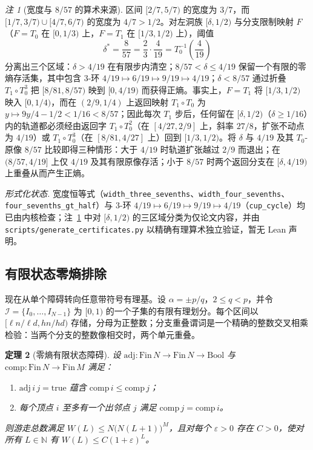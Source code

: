 \documentclass[11pt,a4paper]{article}
\newtheorem{theorem}{定理}[section]
\theoremstyle{remark}
\newtheorem{remark}[theorem]{注}
\newcommand{\N}{\mathbb{N}}
\begin{document}
\begin{remark}[宽度与 $8/57$ 的算术来源]
\label{rem:857}
区间 $[2/7,5/7)$ 的宽度为 $3/7$，而 $[1/7,3/7) \cup [4/7,6/7)$ 的宽度为 $4/7 > 1/2$。对左洞族 $[\delta,1/2)$ 与分支限制映射 $F$（$F = T_{0}$ 在 $[0,1/3)$ 上，$F = T_{1}$ 在 $[1/3,1/2)$ 上），阈值
\[
  \delta^{*} = \frac{8}{57} = \frac23 \cdot \frac{4}{19} = T_{0}^{-1}\!\left(\frac{4}{19}\right)
\]
分离出三个区域：$\delta > 4/19$ 在有限步内清空；$8/57 < \delta \le 4/19$ 保留一个有限的零熵存活集，其中包含 $3$-环 $4/19 \mapsto 6/19 \mapsto 9/19 \mapsto 4/19$；$\delta < 8/57$ 通过折叠 $T_{1} \circ T_{0}^{3}$ 把 $[8/81,8/57)$ 映到 $[0,4/19)$ 而获得正熵。事实上，$F = T_{1}$ 将 $[1/3,1/2)$ 映入 $[0,1/4)$，而在 $(2/9,1/4)$ 上返回映射 $T_{1} \circ T_{0}$ 为 $y \mapsto 9y/4 - 1/2 < 1/16 < 8/57$；因此每次 $T_{1}$ 步后，任何留在 $[\delta,1/2)$（$\delta \ge 1/16$）内的轨道都必须经由返回字 $T_{1} \circ T_{0}^{2}$（在 $[4/27,2/9]$ 上，斜率 $27/8$，扩张不动点为 $4/19$）或 $T_{1} \circ T_{0}^{3}$（在 $[8/81,4/27]$ 上）回到 $[1/3,1/2)$。将 $\delta$ 与 $4/19$ 及其 $T_{0}$-原像 $8/57$ 比较即得三种情形：大于 $4/19$ 时轨道扩张越过 $2/9$ 而退出；在 $(8/57,4/19]$ 上仅 $4/19$ 及其有限原像存活；小于 $8/57$ 时两个返回分支在 $[\delta,4/19)$ 上重叠从而产生正熵。
\end{remark}

\noindent\emph{形式化状态.} 宽度恒等式（\texttt{width\_\allowbreak three\_\allowbreak sevenths}、\texttt{width\_\allowbreak four\_\allowbreak sevenths}、\texttt{four\_\allowbreak sevenths\_\allowbreak gt\_\allowbreak half}）与 $3$-环 $4/19 \mapsto 6/19 \mapsto 9/19 \mapsto 4/19$（\texttt{cup\_\allowbreak cycle}）均已由内核检查；注~\ref{rem:857} 中对 $[\delta,1/2)$ 的三区域分类为仅论文内容，并由 \texttt{scripts/\allowbreak generate\_\allowbreak certificates.py} 以精确有理算术独立验证，暂无 Lean 声明。

\subsection{有限状态零熵排除}

现在从单个障碍转向任意带符号有理基。设 $\alpha = \pm p/q$，$2 \le q < p$，并令 $\mathcal{I} = \{I_{0}, \dots, I_{N-1}\}$ 为 $[0,1)$ 的一个子集的有限有理划分。每个区间以 $[\ell n/\ell d, h n/h d)$ 存储，分母为正整数；分支重叠谓词是一个精确的整数交叉相乘检验：当两个分支的整数像相交时，两个单元重叠。

\begin{theorem}[零熵有限状态障碍]
\label{thm:ze}
设 $\mathrm{adj} : \mathrm{Fin}\,N \to \mathrm{Fin}\,N \to \mathrm{Bool}$ 与 $\mathrm{comp} : \mathrm{Fin}\,N \to \mathrm{Fin}\,M$ 满足：
\begin{enumerate}[leftmargin=1.5em]
  \item $\mathrm{adj}\,i\,j = \mathrm{true}$ 蕴含 $\mathrm{comp}\,i \le \mathrm{comp}\,j$；
  \item 每个顶点 $i$ 至多有一个出邻点 $j$ 满足 $\mathrm{comp}\,j = \mathrm{comp}\,i$。
\end{enumerate}
则游走总数满足 $W(L) \le N\bigl(N(L+1)\bigr)^{M}$，且对每个 $\varepsilon > 0$ 存在 $C > 0$，使对所有 $L \in \N$ 有 $W(L) \le C (1+\varepsilon)^{L}$。
\end{theorem}
\end{document}
